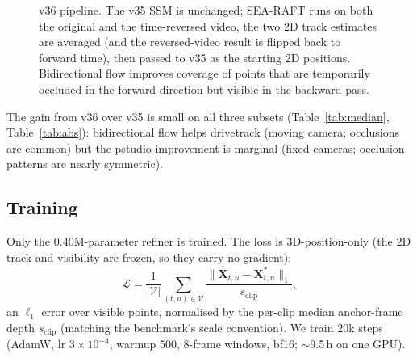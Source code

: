 \documentclass[11pt,a4paper]{article}
\begin{document}
\begin{figure}[h]
\centering
{}
\caption{v36 pipeline. The v35 SSM is unchanged; SEA-RAFT runs on both the original and the
time-reversed video, the two 2D track estimates are averaged (and the reversed-video result is
flipped back to forward time), then passed to v35 as the starting 2D positions.
Bidirectional flow improves coverage of points that are temporarily occluded in the forward
direction but visible in the backward pass.}
\label{fig:v36-flow}
\end{figure}

The gain from v36 over v35 is small on all three subsets (Table~\ref{tab:median},
Table~\ref{tab:abs}): bidirectional flow helps drivetrack (moving camera; occlusions are common)
but the pstudio improvement is marginal (fixed cameras; occlusion patterns are nearly symmetric).

\subsection{Training}
Only the $0.40$M-parameter refiner is trained. The loss is 3D-position-only (the 2D track and
visibility are frozen, so they carry no gradient):
\begin{equation}
\mathcal{L} = \frac{1}{|\mathcal{V}|}\sum_{(t,n)\in\mathcal{V}}
\frac{\lVert \hat{\mathbf X}_{t,n}-\mathbf X^{*}_{t,n}\rVert_1}{s_{\text{clip}}},
\end{equation}
an $\ell_1$ error over visible points, normalised by the per-clip median anchor-frame depth
$s_{\text{clip}}$ (matching the benchmark's scale convention). We train $20$k steps (AdamW,
lr $3\!\times\!10^{-4}$, warmup $500$, $8$-frame windows, bf16; $\sim$9.5\,h on one GPU).
\end{document}
